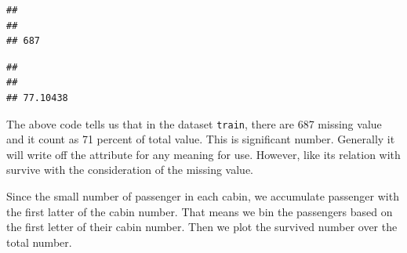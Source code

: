 \documentclass[
]{book}
\newenvironment{Shaded}{\begin{snugshade}}{\end{snugshade}}
\newcommand{\CommentTok}[1]{\textcolor[rgb]{0.56,0.35,0.01}{\textit{#1}}}
\newcommand{\DataTypeTok}[1]{\textcolor[rgb]{0.13,0.29,0.53}{#1}}
\newcommand{\DecValTok}[1]{\textcolor[rgb]{0.00,0.00,0.81}{#1}}
\newcommand{\KeywordTok}[1]{\textcolor[rgb]{0.13,0.29,0.53}{\textbf{#1}}}
\newcommand{\NormalTok}[1]{#1}
\newcommand{\OperatorTok}[1]{\textcolor[rgb]{0.81,0.36,0.00}{\textbf{#1}}}
\newcommand{\StringTok}[1]{\textcolor[rgb]{0.31,0.60,0.02}{#1}}
\begin{document}
\begin{verbatim}
## 
##     
## 687
\end{verbatim}

\begin{Shaded}
\end{Shaded}

\begin{verbatim}
## 
##          
## 77.10438
\end{verbatim}

The above code tells us that in the dataset \texttt{train}, there are 687 missing value and it count as 71 percent of total value. This is significant number. Generally it will write off the attribute for any meaning for use. However, like its relation with survive with the consideration of the missing value.

Since the small number of passenger in each cabin, we accumulate passenger with the first latter of the cabin number. That means we bin the passengers based on the first letter of their cabin number. Then we plot the survived number over the total number.

\begin{Shaded}
\end{Shaded}
\end{document}
